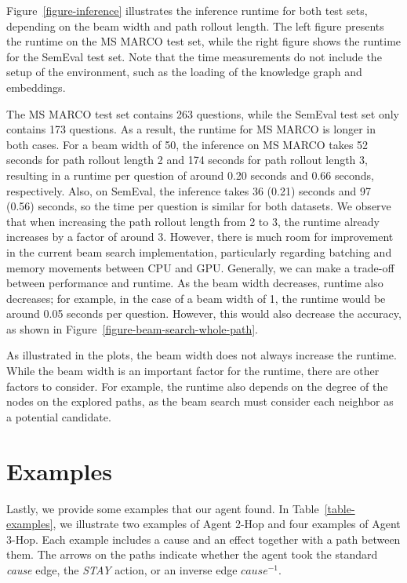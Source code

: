 Figure~\ref{figure-inference} illustrates the inference runtime for both test sets, depending on the beam width and path rollout length.
The left figure presents the runtime on the MS MARCO test set, while the right figure shows the runtime for the SemEval test set.
Note that the time measurements do not include the setup of the environment, such as the 
loading of the knowledge graph and embeddings.

The MS MARCO test set contains 263 questions, while the SemEval test set only contains 173 questions. As a result, the runtime for MS MARCO is longer in both cases.
For a beam width of 50, the inference on MS MARCO takes 52 seconds for path rollout length 2 and 174 seconds for path rollout length 3, resulting in a runtime per question of around 0.20 seconds and 0.66 seconds, respectively.
Also, on SemEval, the inference takes 36 (0.21) seconds and 97 (0.56) seconds, so the time per question is 
similar for both datasets.
We observe that when increasing the path rollout length from 2 to 3,
the runtime 
already increases by a factor of around 3.
However, there is much room for improvement in the current beam search implementation,
particularly regarding batching and memory movements between CPU and GPU.
Generally, we can make a trade-off between performance and runtime.
As the beam width decreases, runtime also decreases; for example, in the case of a beam width of 1, the runtime would be around 0.05 seconds per question.
However, this would also decrease the accuracy, as shown in Figure~\ref{figure-beam-search-whole-path}.

As illustrated in the plots, the beam width does not always increase the runtime.
While the beam width is an important factor for the runtime, there are other factors to consider.
For example, the runtime also depends on the degree of the nodes on the explored paths, as the beam search must consider each neighbor as a potential candidate.

\section{Examples}
\label{sec:path-analysis}

Lastly, we provide some examples that our agent found. In Table~\ref{table-examples},
we illustrate two examples of Agent 2-Hop and four examples of Agent 3-Hop.
Each example includes a cause and an effect together with a path between them. 
The arrows on the paths indicate whether the agent took the standard \textit{cause} edge, the \textit{STAY} action, or an inverse edge \textit{$cause^{-1}$}.

